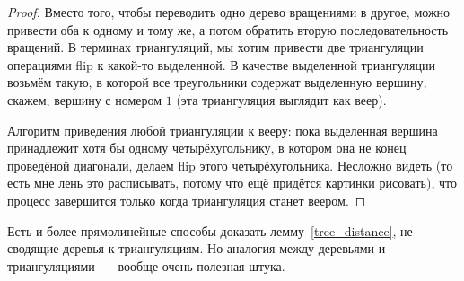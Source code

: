 \begin{proof}
	Вместо того, чтобы переводить одно дерево вращениями в другое, можно привести оба к одному и тому же, а потом обратить вторую последовательность вращений. В терминах триангуляций, мы хотим привести две триангуляции операциями
	\textrm{flip} к какой-то выделенной. В качестве выделенной триангуляции возьмём такую, в которой все треугольники содержат выделенную вершину, скажем, вершину с номером $1$
	(эта триангуляция выглядит как веер).

	Алгоритм приведения любой триангуляции к вееру: пока выделенная вершина принадлежит хотя бы одному четырёхугольнику, в котором она не конец проведёной диагонали, делаем \textrm{flip} этого четырёхугольника. Несложно видеть (то есть мне лень это расписывать, потому что ещё придётся картинки рисовать), что процесс завершится только когда триангуляция станет веером.
\end{proof}

\begin{remark} Есть и более прямолинейные способы доказать лемму~\ref{tree_distance}, не
	сводящие деревья к триангуляциям. Но аналогия между деревьями и триангуляциями~--- вообще очень полезная штука.
\end{remark}

